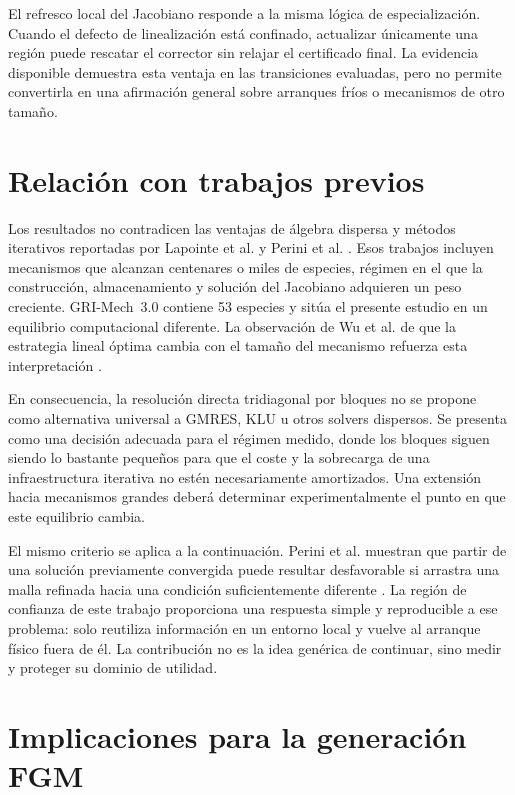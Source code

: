 \documentclass[12pt,a4paper,twoside,openany]{book}
\begin{document}
El refresco local del Jacobiano responde a la misma lógica de especialización.
Cuando el defecto de linealización está confinado, actualizar únicamente una
región puede rescatar el corrector sin relajar el certificado final. La evidencia
disponible demuestra esta ventaja en las transiciones evaluadas, pero no permite
convertirla en una afirmación general sobre arranques fríos o mecanismos de otro
tamaño.

\section{Relación con trabajos previos}

Los resultados no contradicen las ventajas de álgebra dispersa y métodos
iterativos reportadas por Lapointe et al. y Perini et al.
\cite{Lapointe2019,Perini2025}. Esos trabajos incluyen mecanismos que alcanzan
centenares o miles de especies, régimen en el que la construcción, almacenamiento
y solución del Jacobiano adquieren un peso creciente. GRI-Mech~3.0 contiene 53
especies y sitúa el presente estudio en un equilibrio computacional diferente.
La observación de Wu et al. de que la estrategia lineal óptima cambia con el
tamaño del mecanismo refuerza esta interpretación \cite{Wu2023}.

En consecuencia, la resolución directa tridiagonal por bloques no se propone
como alternativa universal a GMRES, KLU u otros solvers dispersos. Se presenta
como una decisión adecuada para el régimen medido, donde los bloques siguen
siendo lo bastante pequeños para que el coste y la sobrecarga de una
infraestructura iterativa no estén necesariamente amortizados. Una extensión
hacia mecanismos grandes deberá determinar experimentalmente el punto en que
este equilibrio cambia.

El mismo criterio se aplica a la continuación. Perini et al. muestran que partir
de una solución previamente convergida puede resultar desfavorable si arrastra
una malla refinada hacia una condición suficientemente diferente
\cite{Perini2025}. La región de confianza de este trabajo proporciona una
respuesta simple y reproducible a ese problema: solo reutiliza información en
un entorno local y vuelve al arranque físico fuera de él. La contribución no es
la idea genérica de continuar, sino medir y proteger su dominio de utilidad.

\section{Implicaciones para la generación FGM}
\end{document}
